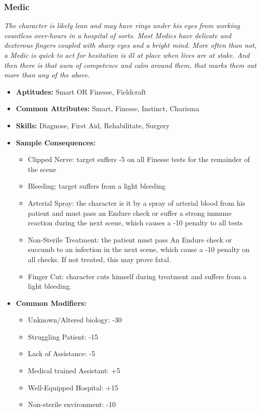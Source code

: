 \subsubsection{Medic}\label{Medic}
\textit{The character is likely lean and may have rings under his eyes from working countless over-hours in a hospital of sorts.
Most Medics have delicate and dexterous fingers coupled with sharp eyes and a bright mind.
More often than not, a Medic is quick to act for hesitation is ill at place when lives are at stake.
And then there is that aura of competence and calm around them, that marks them out more than any of the above.}
\begin{itemize}
	\item \textbf{Aptitudes:} Smart OR Finesse, Fieldcraft
	\item \textbf{Common Attributes:} Smart, Finesse, Instinct, Charisma
	\item \textbf{Skills:} Diagnose, First Aid, Rehabilitate, Surgery
	\item \textbf{Sample Consequences:} 
	\begin{itemize}
		\item Clipped Nerve: target suffers -5 on all Finesse tests for the remainder of the scene
		\item Bleeding: target suffers from a light bleeding
		\item Arterial Spray: the character is it by a spray of arterial blood from his patient and must pass an Endure check or suffer a strong immune reaction during the next scene, which causes a -10 penalty to all tests
		\item Non-Sterile Treatment: the patient must pass An Endure check or succumb to an infection in the next scene, which cause a -10 penalty on all checks. If not treated, this may prove fatal.
		\item Finger Cut: character cuts himself during treatment and suffers from a light bleeding.
	\end{itemize}
	\item \textbf{Common Modifiers:}
	\begin{itemize}
		\item Unknown/Altered biology: -30
		\item Struggling Patient: -15
		\item Lack of Assistance: -5
		\item Medical trained Assistant: +5
		\item Well-Equipped Hospital: +15
		\item Non-sterile environment: -10
	\end{itemize}
\end{itemize}

